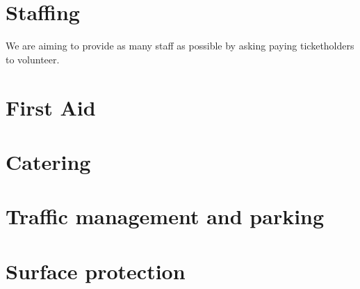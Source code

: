 \section{Staffing}

We are aiming to provide as many staff as possible by asking paying
ticketholders to volunteer.

\section{First Aid}

\section{Catering}

\section{Traffic management and parking}

\section{Surface protection}

